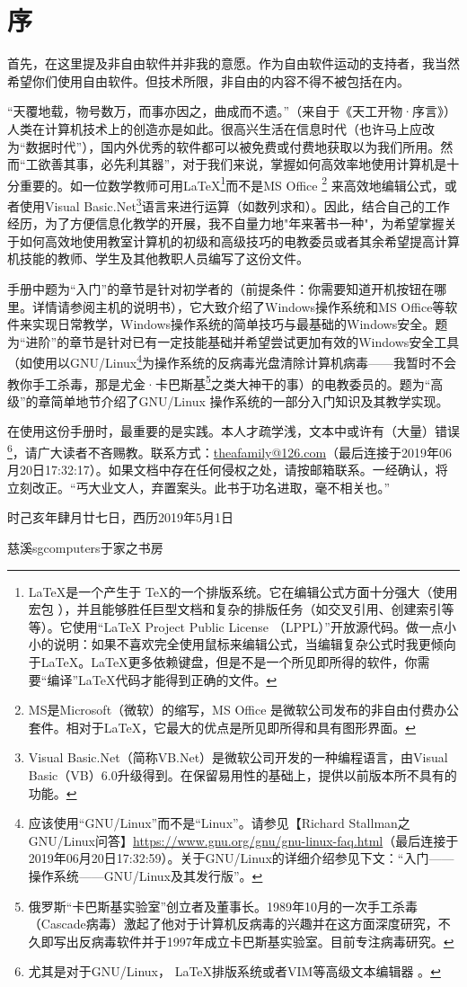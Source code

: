 \documentclass{book}
\begin{document}
\section{序}
首先，在这里提及非自由软件并非我的意愿。作为自由软件运动的支持者，我当然希望你们使用自由软件。但技术所限，非自由的内容不得不被包括在内。\par
“天覆地载，物号数万，而事亦因之，曲成而不遗。”（来自于《天工开物·序言》）人类在计算机技术上的创造亦是如此。很高兴生活在信息时代（也许马上应改为“数据时代”），国内外优秀的软件都可以被免费或付费地获取以为我们所用。然而“工欲善其事，必先利其器”，对于我们来说，掌握如何高效率地使用计算机是十分重要的。如一位数学教师可用\LaTeX\footnote{\LaTeX 是一个产生于 \TeX 的一个排版系统。它在编辑公式方面十分强大（使用 \AmSTeX 宏包 ），并且能够胜任巨型文档和复杂的排版任务（如交叉引用、创建索引等等）。它使用“LaTeX Project Public Li­cense （LPPL）”开放源代码。做一点小小的说明：如果不喜欢完全使用鼠标来编辑公式，当编辑复杂公式时我更倾向于\LaTeX。\LaTeX 更多依赖键盘，但是不是一个所见即所得的软件，你需要“编译”\LaTeX 代码才能得到正确的文件。}而不是MS Office \footnote{MS是Microsoft（微软）的缩写，MS Office 是微软公司发布的非自由付费办公套件。相对于\LaTeX ，它最大的优点是所见即所得和具有图形界面。} 来高效地编辑公式，或者使用Visual Basic.Net\footnote{Visual Basic.Net（简称VB.Net）是微软公司开发的一种编程语言，由Visual Basic（VB）6.0升级得到。在保留易用性的基础上，提供以前版本所不具有的功能。}语言来进行运算（如数列求和）。因此，结合自己的工作经历，为了方便信息化教学的开展，我不自量力地"年来著书一种"，为希望掌握关于如何高效地使用教室计算机的初级和高级技巧的电教委员或者其余希望提高计算机技能的教师、学生及其他教职人员编写了这份文件。\par
手册中题为“入门”的章节是针对初学者的（前提条件：你需要知道开机按钮在哪里。详情请参阅主机的说明书），它大致介绍了Windows操作系统和MS Office等软件来实现日常教学，Windows操作系统的简单技巧与最基础的Windows安全。题为“进阶”的章节是针对已有一定技能基础并希望尝试更加有效的Windows安全工具（如使用以GNU/Linux\footnote{应该使用“GNU/Linux”而不是“Linux”。请参见【Richard Stallman之GNU/Linux问答】\url{https://www.gnu.org/gnu/gnu-linux-faq.html}（最后连接于2019年06月20日17:32:59）。关于GNU/Linux的详细介绍参见下文：“入门——操作系统——GNU/Linux及其发行版”。}为操作系统的反病毒光盘清除计算机病毒——我暂时不会教你手工杀毒，那是尤金·卡巴斯基\footnote{俄罗斯“卡巴斯基实验室”创立者及董事长。1989年10月的一次手工杀毒（Cascade病毒）激起了他对于计算机反病毒的兴趣并在这方面深度研究，不久即写出反病毒软件并于1997年成立卡巴斯基实验室。目前专注病毒研究。}之类大神干的事）的电教委员的。题为“高级”的章简单地节介绍了GNU/Linux 操作系统的一部分入门知识及其教学实现。\par
在使用这份手册时，最重要的是实践。本人才疏学浅，文本中或许有（大量）错误\footnote{尤其是对于GNU/Linux， \LaTeX 排版系统或者VIM等高级文本编辑器 。}，请广大读者不吝赐教。联系方式：\url{theafamily@126.com}（最后连接于2019年06月20日17:32:17）。如果文档中存在任何侵权之处，请按邮箱联系。一经确认，将立刻改正。“丐大业文人，弃置案头。此书于功名进取，毫不相关也。”\par
时己亥年肆月廿七日，西历2019年5月1日\par
慈溪sgcomputers于家之书房
\end{document}
